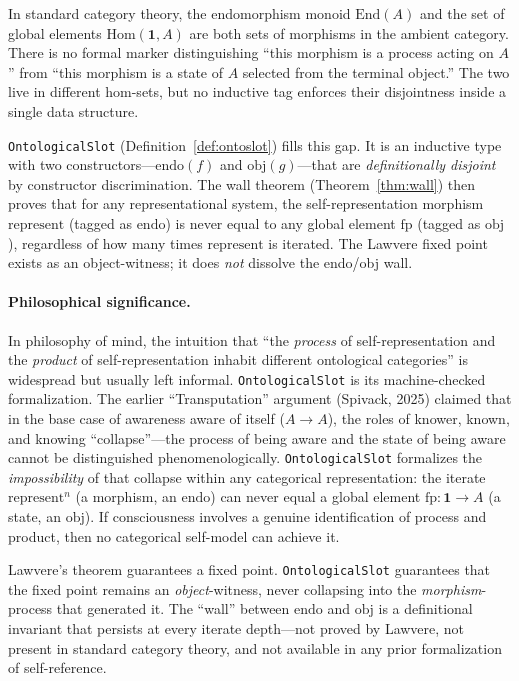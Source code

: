 \documentclass[11pt]{article}
\begin{document}
In standard category theory, the endomorphism monoid $\mathrm{End}(A)$
and the set of global elements $\mathrm{Hom}(\mathbf{1}, A)$ are both
sets of morphisms in the ambient category.  There is no formal marker
distinguishing ``this morphism is a process acting on $A$'' from ``this
morphism is a state of $A$ selected from the terminal object.''  The two
live in different hom-sets, but no inductive tag enforces their
disjointness inside a single data structure.

\texttt{OntologicalSlot} (Definition~\ref{def:ontoslot}) fills this gap.
It is an inductive type with two constructors---$\mathrm{endo}(f)$ and
$\mathrm{obj}(g)$---that are \emph{definitionally disjoint} by
constructor discrimination.  The wall theorem
(Theorem~\ref{thm:wall}) then proves that for any representational
system, the self-representation morphism $\mathrm{represent}$ (tagged as
$\mathrm{endo}$) is never equal to any global element $\mathrm{fp}$
(tagged as $\mathrm{obj}$), regardless of how many times
$\mathrm{represent}$ is iterated.  The Lawvere fixed point exists as an
object-witness; it does \emph{not} dissolve the endo/obj wall.

\paragraph{Philosophical significance.}
In philosophy of mind, the intuition that ``the \emph{process} of
self-representation and the \emph{product} of self-representation inhabit
different ontological categories'' is widespread but usually left
informal.  \texttt{OntologicalSlot} is its machine-checked
formalization.  The earlier ``Transputation'' argument (Spivack, 2025)
claimed that in the base case of awareness aware of itself ($A \to A$),
the roles of knower, known, and knowing ``collapse''---the process of
being aware and the state of being aware cannot be distinguished
phenomenologically.  \texttt{OntologicalSlot} formalizes the
\emph{impossibility} of that collapse within any categorical
representation: the iterate $\mathrm{represent}^n$ (a morphism, an
$\mathrm{endo}$) can never equal a global element $\mathrm{fp} :
\mathbf{1} \to A$ (a state, an $\mathrm{obj}$).  If consciousness
involves a genuine identification of process and product, then no
categorical self-model can achieve it.

\begin{keybox}[title=The wall that Lawvere does not build]
Lawvere's theorem guarantees a fixed point.
\texttt{OntologicalSlot} guarantees that the fixed point remains an
\emph{object}-witness, never collapsing into the
\emph{morphism}-process that generated it.  The ``wall'' between
$\mathrm{endo}$ and $\mathrm{obj}$ is a definitional invariant that
persists at every iterate depth---not proved by Lawvere, not present
in standard category theory, and not available in any prior
formalization of self-reference.
\end{keybox}
\end{document}
